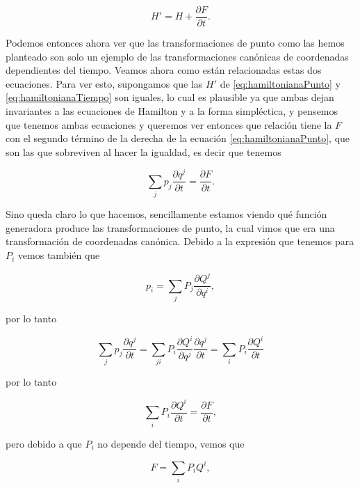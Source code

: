 \documentclass[a4paper,10pt]{article}
\numberwithin{equation}{section}
\begin{document}
\begin{equation}
 H' = H + \frac{\partial F}{\partial t}.
 \label{eq:hamiltonianaTiempo}
\end{equation}

Podemos entonces ahora ver que las transformaciones de punto como las hemos planteado 
son solo un ejemplo de las transformaciones canónicas de coordenadas dependientes 
del tiempo. Veamos ahora como están relacionadas estas dos ecuaciones. Para ver esto, 
supongamos que las $H'$ de \eqref{eq:hamiltonianaPunto} y \eqref{eq:hamiltonianaTiempo} 
son iguales, lo cual es plausible ya que ambas dejan invariantes a las ecuaciones 
de Hamilton y a la forma simpléctica, y pensemos que tenemos ambas ecuaciones 
y queremos ver entonces que relación tiene la $F$ con el segundo término de la 
derecha de la ecuación \eqref{eq:hamiltonianaPunto}, que son las que sobreviven 
al hacer la igualdad, es decir que tenemos 

\begin{equation}
 \sum_j p_j \frac{\partial q^j}{\partial t} = \frac{\partial F}{\partial t}.
\end{equation}

Sino queda claro lo que hacemos, sencillamente estamos viendo qué función generadora 
produce las transformaciones de punto, la cual vimos que era una transformación de 
coordenadas canónica. Debido a la expresión que tenemos para $P_i$ vemos también que 

\begin{equation}
 p_i = \sum_j P_j \frac{\partial Q^j}{\partial q^i},
\end{equation}

por lo tanto 

\begin{equation}
 \sum_j p_j \frac{\partial q^j}{\partial t} = 
 \sum_{ji} P_i\frac{\partial Q^i}{\partial q^j}\frac{\partial q^j}{\partial t} = 
 \sum_i P_i \frac{\partial Q^i}{\partial t}
\end{equation}

por lo tanto 

\begin{equation}
 \sum_i P_i \frac{\partial Q^i}{\partial t} = \frac{\partial F}{\partial t},
\end{equation}

pero debido a que $P_i$ no  depende del tiempo, vemos que 

\begin{equation}
 F = \sum_i P_i Q^i,
\end{equation}
\end{document}

